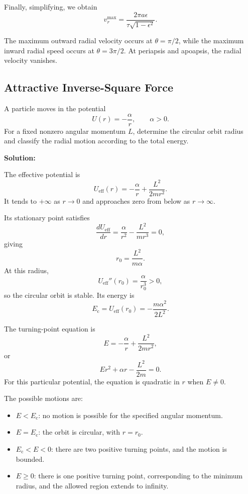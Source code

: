 \documentclass[12pt]{article}
\begin{document}
Finally, simplifying, we obtain
\[
\boxed{
v_r^{\max}
=\frac{2\pi a\epsilon}{\tau\sqrt{1-\epsilon^2}}.
}
\]

The maximum outward radial velocity occurs at $\theta=\pi/2$,
while the maximum inward radial speed occurs at
$\theta=3\pi/2$. At periapsis and apoapsis, the radial
velocity vanishes.

\subsection{Attractive Inverse-Square Force}

A particle moves in the potential
\[
    U(r)=-\frac{\alpha}{r},
    \qquad \alpha>0.
\]
For a fixed nonzero angular momentum $L$, determine the circular
orbit radius and classify the radial motion according to the
total energy.

\textbf{Solution:}

The effective potential is
\[
    U_{\mathrm{eff}}(r)
    =-\frac{\alpha}{r}+\frac{L^2}{2mr^2}.
\]
It tends to $+\infty$ as $r\to0$ and approaches zero from below
as $r\to\infty$.

Its stationary point satisfies
\[
    \frac{dU_{\mathrm{eff}}}{dr}
    =\frac{\alpha}{r^2}-\frac{L^2}{mr^3}=0,
\]
giving
\[
    r_0=\frac{L^2}{m\alpha}.
\]
At this radius,
\[
    U_{\mathrm{eff}}''(r_0)
    =\frac{\alpha}{r_0^3}>0,
\]
so the circular orbit is stable. Its energy is
\[
    E_{\mathrm{c}}
    =U_{\mathrm{eff}}(r_0)
    =-\frac{m\alpha^2}{2L^2}.
\]

The turning-point equation is
\[
    E=-\frac{\alpha}{r}+\frac{L^2}{2mr^2},
\]
or
\[
    Er^2+\alpha r-\frac{L^2}{2m}=0.
\]
For this particular potential, the equation is quadratic in $r$
when $E\neq0$.

The possible motions are:
\begin{itemize}
    \item $E<E_{\mathrm{c}}$: no motion is possible for the
    specified angular momentum.

    \item $E=E_{\mathrm{c}}$: the orbit is circular,
    with $r=r_0$.

    \item $E_{\mathrm{c}}<E<0$: there are two positive turning
    points, and the motion is bounded.

    \item $E\geq0$: there is one positive turning point,
    corresponding to the minimum radius, and the allowed
    region extends to infinity.
\end{itemize}
\end{document}
